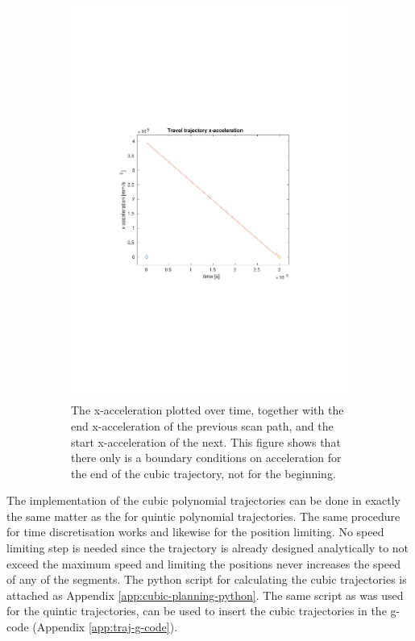 \begin{figure}[hp]
\begin{subfigure}{0.72\textwidth}
        \includegraphics[clip, trim=3.5cm 9cm 4cm 9cm, width=\textwidth]{Pictures/3-traj-acc.pdf}
        \caption{The x-acceleration plotted over time, together with the end x-acceleration of the previous scan path, and the start x-acceleration of the next. This figure shows that there only is a boundary conditions on acceleration for the end of the cubic trajectory, not for the beginning.}
        \label{fig:3-traj-acc}
    \end{subfigure}
    \caption{}
    \label{fig:3-traj-vel-acc}
\end{figure}

The implementation of the cubic polynomial trajectories can be done in exactly the same matter as the for quintic polynomial trajectories. The same procedure for time discretisation works and likewise for the position limiting. No speed limiting step is needed since the trajectory is already designed analytically to not exceed the maximum speed and limiting the positions never increases the speed of any of the segments. The python script for calculating the cubic trajectories is attached as Appendix \ref{app:cubic-planning-python}. The same script as was used for the quintic trajectories, can be used to insert the cubic trajectories in the g-code (Appendix \ref{app:traj-g-code}).

